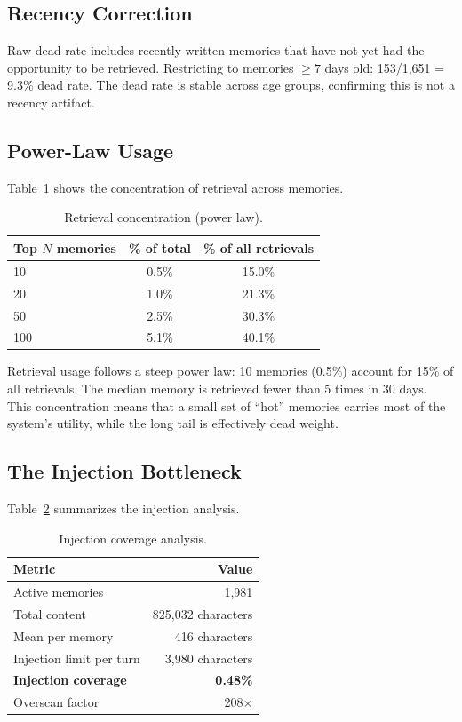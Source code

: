\documentclass[sigconf,nonacm]{acmart}
\begin{document}
\subsection{Recency Correction}

Raw dead rate includes recently-written memories that have not yet had the opportunity to be retrieved. Restricting to memories $\geq 7$ days old: 153/1,651 = 9.3\% dead rate. The dead rate is stable across age groups, confirming this is not a recency artifact.

\subsection{Power-Law Usage}
\label{sec:powerlaw}

Table~\ref{tab:powerlaw} shows the concentration of retrieval across memories.

\begin{table}[h]
\centering
\caption{Retrieval concentration (power law).}
\label{tab:powerlaw}
\begin{tabular}{lcc}
\toprule
Top $N$ memories & \% of total & \% of all retrievals \\
\midrule
10 & 0.5\% & 15.0\% \\
20 & 1.0\% & 21.3\% \\
50 & 2.5\% & 30.3\% \\
100 & 5.1\% & 40.1\% \\
\bottomrule
\end{tabular}
\end{table}

Retrieval usage follows a steep power law: 10 memories (0.5\%) account for 15\% of all retrievals. The median memory is retrieved fewer than 5 times in 30 days. This concentration means that a small set of ``hot'' memories carries most of the system's utility, while the long tail is effectively dead weight.

\subsection{The Injection Bottleneck}
\label{sec:injection}

Table~\ref{tab:injection} summarizes the injection analysis.

\begin{table}[h]
\centering
\caption{Injection coverage analysis.}
\label{tab:injection}
\begin{tabular}{lr}
\toprule
Metric & Value \\
\midrule
Active memories & 1,981 \\
Total content & 825,032 characters \\
Mean per memory & 416 characters \\
Injection limit per turn & 3,980 characters \\
\textbf{Injection coverage} & \textbf{0.48\%} \\
Overscan factor & 208$\times$ \\
\bottomrule
\end{tabular}
\end{table}
\end{document}
